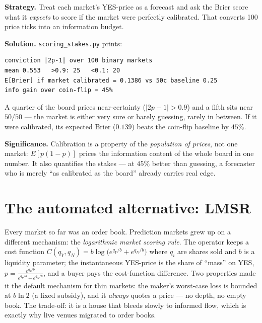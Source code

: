 \begin{example}\label{ex:conviction}
\textbf{Strategy.} Treat each market's YES-price as a forecast and
ask the Brier score what it \emph{expects} to score if the market
were perfectly calibrated. That converts 100 price ticks into an
information budget.

\textbf{Solution.} \texttt{scoring\_stakes.py} prints:
\begin{verbatim}
conviction |2p-1| over 100 binary markets
mean 0.553   >0.9: 25   <0.1: 20
E[Brier] if market calibrated = 0.1386 vs 50c baseline 0.25
info gain over coin-flip = 45%
\end{verbatim}
A quarter of the board prices near-certainty ($|2p-1|>0.9$) and a
fifth sits near $50/50$ --- the market is either very sure or
barely guessing, rarely in between. If it were calibrated, its
expected Brier ($0.139$) beats the coin-flip baseline by $45\%$.

\textbf{Significance.} Calibration is a property of the
\emph{population of prices}, not one market: $E[p(1-p)]$ prices the
information content of the whole board in one number. It also
quantifies the stakes --- at $45\%$ better than guessing, a
forecaster who is merely ``as calibrated as the board'' already
carries real edge.
\end{example}

\section{The automated alternative: LMSR}\label{sec:lmsr}
Every market so far was an order book. Prediction markets grew up
on a different mechanism: the \emph{logarithmic market scoring
rule}. The operator keeps a cost function
$C(q_Y,q_N)=b\log\!\big(e^{q_Y/b}+e^{q_N/b}\big)$ where $q_i$ are
shares sold and $b$ is a liquidity parameter; the instantaneous
YES-price is the share of ``mass'' on YES,
$p=\frac{e^{q_Y/b}}{e^{q_Y/b}+e^{q_N/b}}$, and a buyer pays the
cost-function difference. Two properties made it the default
mechanism for thin markets: the maker's worst-case loss is bounded
at $b\ln 2$ (a fixed subsidy), and it \emph{always} quotes a price
--- no depth, no empty book. The trade-off: it is a house that
bleeds slowly to informed flow, which is exactly why live venues
migrated to order books.

